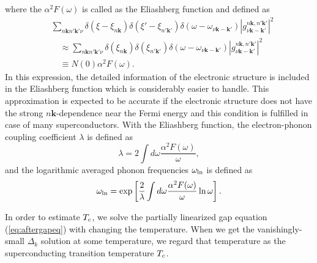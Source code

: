 %
where the $\alpha^2F(\omega)$ is called as the Eliashberg function and defined as
%
\begin{equation}
	\begin{split}
	& \sum_{n\bm k n'\bm k' \nu} \delta(\xi-\xi_{n\bm k})\delta(\xi'-\xi_{n'\bm k'})
	\delta(\omega-\omega_{\nu\bm k - \bm k'})|g^{n\bm k,n'\bm k'}_{\nu \bm k - \bm k'}|^2 \\
	&\quad \approx \sum_{n\bm k n'\bm k' \nu} \delta(\xi_{n\bm k})\delta(\xi_{n'\bm k'})
	\delta(\omega-\omega_{\nu\bm k - \bm k'}) |g^{n\bm k,n'\bm k'}_{\nu \bm k - \bm k'}|^2 \\
 	&\quad \equiv N(0)\alpha^2F(\omega).
	\label{eq:a2F}
\end{split}
\end{equation}
%
In this expression, the detailed information of the electronic structure is included in the
Eliashberg function which is considerably easier to handle.
This approximation is expected to be accurate if the electronic structure does not have the
strong $n\bm k$-dependence near the Fermi energy and this condition is fulfilled in case of 
many superconductors.
With the Eliashberg function, the electron-phonon coupling coefficient $\lambda$ is defined as
%
\begin{equation}
	\lambda = 2\int d\omega \frac{\alpha^2F(\omega)}{\omega},
	\label{eq:elphlambda}
\end{equation}
%
and the logarithmic averaged phonon frequencies $\omega_{\rm ln}$ is defined as
%
\begin{equation}
	\omega_{\rm ln} = \exp\left[ \frac{2}{\lambda}\int d\omega \frac{\alpha^2F(\omega)}{\omega}\ln \omega \right].
	\label{eq:omegaln}
\end{equation}
%

In order to estimate $T_{\rm c}$, we solve the partially linearized gap equation (\ref{eq:aftergapeq}) with changing 
the temperature. When we get the vanishingly-small $\Delta_{k}$ solution at some temperature, 
we regard that temperature as the superconducting transition temperature $T_{\rm c}$.
%

